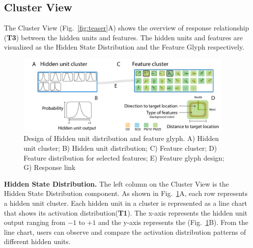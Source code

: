 \subsection{Cluster View}

The Cluster View (Fig.~\ref{fig:teaser}A) shows the overview of response relationship (\textbf{T3}) between the hidden units and features. The hidden units and features are visualized as the Hidden State Distribution and the Feature Glyph respectively.


\begin{figure}[t]
	\centering
    \includegraphics[width=0.95\textwidth]{figure/MultiRNNExplorer/design/cluster_design.pdf}
	\vspace{-3mm}
	\caption{Design of Hidden unit distribution and feature glyph. A) Hidden unit cluster; B) Hidden unit distribution; C) Feature cluster; D) Feature distribution for selected features; E) Feature glyph design; G) Response link}
	\label{fig:cluster_design}
	\vspace{-1mm}
\end{figure}


\textbf{Hidden State Distribution.}
The left column on the Cluster View is the Hidden State Distribution component.
As shown in Fig.~\ref{fig:cluster_design}A, each row represents a hidden unit cluster.
Each hidden unit in a cluster is represented as a line chart that shows its activation distribution(\textbf{T1}).
The x-axis represents the hidden unit output ranging from $-1$ to $+1$ and the y-axis represents the  (Fig.~\ref{fig:cluster_design}B).
From the line chart, users can observe and compare the activation distribution patterns of different hidden units. 

